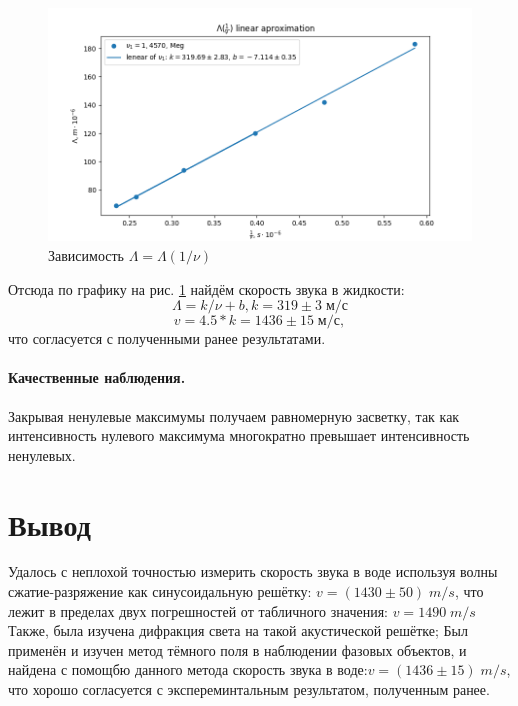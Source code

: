 \documentclass[10pt, a4paper]{article}
\begin{document}
\begin{figure}[H]
	\centering
	\includegraphics[width=1\linewidth]{Figure_2.png}
	\caption{Зависимость $\Lambda = \Lambda (1/\nu)$}
	\label{fig:3}
\end{figure}


Отсюда по графику на рис. \ref{fig:3} найдём скорость звука в жидкости: 
$$\Lambda = k / \nu + b, k = 319 \pm 3 \; м/с$$
$$ v = 4.5 * k = 1436 \pm 15 \; м/с, $$ 
что согласуется с полученными ранее результатами.

\paragraph{Качественные наблюдения. } Закрывая ненулевые максимумы получаем равномерную засветку, так как интенсивность нулевого максимума многократно превышает интенсивность ненулевых.

\section{Вывод}


Удалось с неплохой точностью измерить скорость звука в воде используя волны сжатие-разряжение как синусоидальную решётку: $v = (1430 \pm 50)\; m/s$, что лежит в пределах двух погрешностей от табличного значения:  $v = 1490\; m/s$\\
Также, была изучена дифракция света на такой акустической решётке;
Был применён и изучен метод тёмного поля в наблюдении фазовых объектов, и найдена с помощбю данного метода скорость звука в воде:$v = (1436 \pm 15)\;m/s$, что хорошо согласуется с экспереминтальным результатом, полученным ранее.
\end{document}
